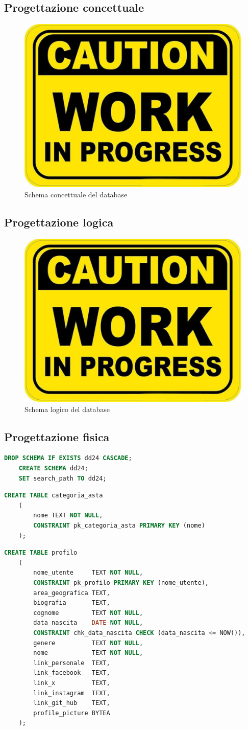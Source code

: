         \subsection{Progettazione concettuale}
            \begin{figure}[htbp!]
                \centering
                    \includegraphics[width=0.1\linewidth]{Immagini/WorkInProgress.pdf}
                \caption{Schema concettuale del database}
                \label{fig:Schema concettuale del database}
            \end{figure}
        \subsection{Progettazione logica}
            \begin{figure}[htbp!]
                \centering
                    \includegraphics[width=0.1\linewidth]{Immagini/WorkInProgress.pdf}
                \caption{Schema logico del database}
                \label{fig:Schema logico del database}
            \end{figure}
        \subsection{Progettazione fisica}
\begin{lstlisting}[language=SQL, caption=Preparazione ambiente]
    DROP SCHEMA IF EXISTS dd24 CASCADE;
    CREATE SCHEMA dd24;
    SET search_path TO dd24;
\end{lstlisting}
            
\begin{lstlisting}[language=SQL, caption=Relazione categoria asta]
    CREATE TABLE categoria_asta
    (
        nome TEXT NOT NULL,
        CONSTRAINT pk_categoria_asta PRIMARY KEY (nome)
    );
\end{lstlisting}

\begin{lstlisting}[language=SQL, caption=Relazione profilo]
    CREATE TABLE profilo
    (
        nome_utente     TEXT NOT NULL,
        CONSTRAINT pk_profilo PRIMARY KEY (nome_utente),
        area_geografica TEXT,
        biografia       TEXT,
        cognome         TEXT NOT NULL,
        data_nascita    DATE NOT NULL,
        CONSTRAINT chk_data_nascita CHECK (data_nascita <= NOW()),
        genere          TEXT NOT NULL,
        nome            TEXT NOT NULL,
        link_personale  TEXT,
        link_facebook   TEXT,
        link_x          TEXT,
        link_instagram  TEXT,
        link_git_hub    TEXT,
        profile_picture BYTEA
    );
\end{lstlisting}

